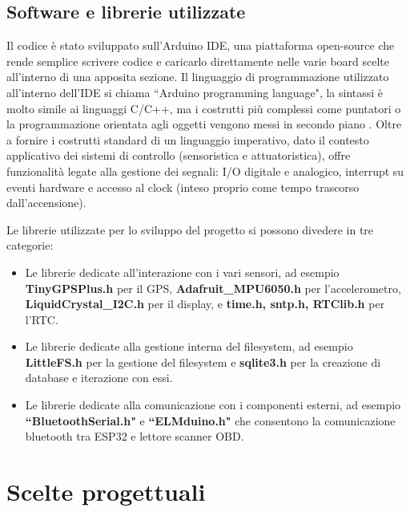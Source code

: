 \documentclass[12pt, a4paper, italian]{report}
\numberwithin{figure}{chapter}
\numberwithin{table}{chapter}
\begin{document}
\subsection{Software e librerie utilizzate}
Il codice è stato sviluppato sull'Arduino IDE, una piattaforma open-source che rende semplice scrivere codice e caricarlo direttamente nelle varie board scelte all'interno di una apposita sezione. Il linguaggio di programmazione utilizzato all'interno dell'IDE si chiama ``Arduino programming language", la sintassi è molto simile ai linguaggi C/C++, ma i costrutti più complessi come puntatori o la programmazione orientata agli oggetti vengono messi in secondo piano \cite{sistemiEmbeddedAtrent}. Oltre a fornire i costrutti standard di un linguaggio imperativo, dato il contesto applicativo dei sistemi di controllo (sensoristica e attuatoristica), offre funzionalità legate alla gestione dei segnali: I/O digitale e analogico, interrupt su eventi hardware e accesso al clock (inteso proprio come tempo trascorso dall'accensione).

Le librerie utilizzate per lo sviluppo del progetto si possono divedere in tre categorie:

\begin{itemize}
    \item Le librerie dedicate all'interazione con i vari sensori, ad esempio \textbf{TinyGPSPlus.h} per il GPS, \textbf{Adafruit\_MPU6050.h} per l'accelerometro, \textbf{LiquidCrystal\_I2C.h} per il display, e \textbf{time.h, sntp.h, RTClib.h} per l'RTC.
    \item Le librerie dedicate alla gestione interna del filesystem, ad esempio \textbf{LittleFS.h} per la gestione del filesystem e \textbf{sqlite3.h} per la creazione di database e iterazione con essi.
    \item Le librerie dedicate alla comunicazione con i componenti esterni, ad esempio \textbf{``BluetoothSerial.h"} e \textbf{``ELMduino.h"} che consentono la comunicazione bluetooth tra ESP32 e lettore scanner OBD.
\end{itemize}

\section{Scelte progettuali}
\end{document}

